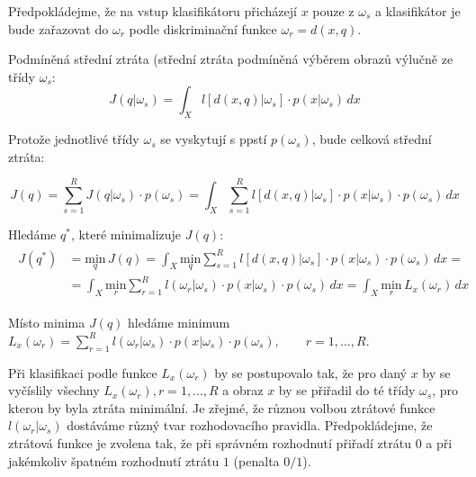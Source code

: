 Předpokládejme, že na vstup klasifikátoru přicházejí $ x $ pouze z $ \omega_s $ a klasifikátor je bude zařazovat do $ \omega_r $ podle diskriminační funkce $ \omega_r = d (x, q) $.

\begin{definition}
Podmíněná střední ztráta (střední ztráta podmíněná výběrem obrazů výlučně ze třídy $ \omega_s $:
\begin{equation}
J(q | \omega_s) = \displaystyle{\int_X} l[d(x,q) | \omega_s] \cdot p(x | \omega_s) \, dx
\end{equation}
\end{definition}

Protože jednotlivé třídy $ \omega_s $ se vyskytují s ppstí $ p(\omega_s) $, bude celková střední ztráta:

\begin{equation}
J(q) = \displaystyle{\sum_{s=1}^R} J(q | \omega_s) \cdot p(\omega_s) = \displaystyle{\int_X \sum_{s=1}^R} l[d(x,q) | \omega_s] \cdot p(x | \omega_s) \cdot p(\omega_s) \, dx
\end{equation}

Hledáme $ q^* $, které minimalizuje $ J(q) $:
\begin{align}
\begin{split}
J(q^*) &= \underset{q}{\mathrm{min}} \, J(q) = \displaystyle{\int_X} \underset{q}{\mathrm{min}} \displaystyle{\sum_{s=1}^R} l[d(x,q) | \omega_s] \cdot p(x | \omega_s) \cdot p(\omega_s) \, dx = \\ &= \displaystyle{\int_X} \underset{r}{\mathrm{min}} \displaystyle{\sum_{r=1}^R} l(\omega_r | \omega_s) \cdot p(x | \omega_s) \cdot p(\omega_s) \, dx = \displaystyle{\int_X} \underset{r}{\mathrm{min}} \, L_x(\omega_r) \, dx
\end{split}
\end{align}

Místo minima $ J(q) $ hledáme minimum $ L_x (\omega_r) = \displaystyle{\sum_{r=1}^R} l(\omega_r | \omega_s) \cdot p(x | \omega_s) \cdot p(\omega_s), \qquad r = 1,...,R $.

Při klasifikaci podle funkce $ L_x (\omega_r) $ by se postupovalo tak, že pro daný $ x $ by se vyčíslily všechny $ L_x(\omega_r), r = 1,...,R $ a obraz $ x $ by se přiřadil do té třídy $ \omega_s $, pro kterou by byla ztráta minimální. Je zřejmé, že různou volbou ztrátové funkce $ l(\omega_r | \omega_s) $ dostáváme různý tvar rozhodovacího pravidla. Předpokládejme, že ztrátová funkce je zvolena tak, že při správném rozhodnutí přiřadí ztrátu $ 0 $ a při jakémkoliv špatném rozhodnutí ztrátu $ 1 $ (penalta $ 0/1 $).

